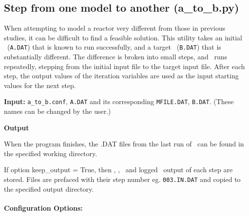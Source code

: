 \subsection{Step from one model to another (a\_to\_b.py)}
\label{sec:atob}

When attempting to model a reactor very different from those in previous studies, it can be difficult to find a feasible solution.  This utility takes an initial \indat\ (\texttt{A.DAT}) that is known to run successfully, and a target \indat\ (\texttt{B.DAT}) that is substantially different.  The difference is broken into small steps, and \process\ runs repeatedly, stepping from the initial input file to the target input file.  After each step, the output values of the iteration variables are used as the input starting values for the next step.

\begin{description}
\item{\textbf{Input:}}
\texttt{a\_to\_b.conf}, \texttt{A.DAT} and its corresponding \texttt{MFILE.DAT}, \texttt{B.DAT}.
(These names can be changed by the user.)

\item{\textbf{Output}}

When the program finishes, the .DAT files from the last run of \process\ can
be found in the specified working directory.

If option keep\_output = True, then \indat, \outdat, \mfile\ and logged \process\
output of each step are stored. Files are prefaced with their step number
eg. \texttt{003.IN.DAT} and copied to the specified output directory.

\end{description}

\paragraph{Configuration Options:}

